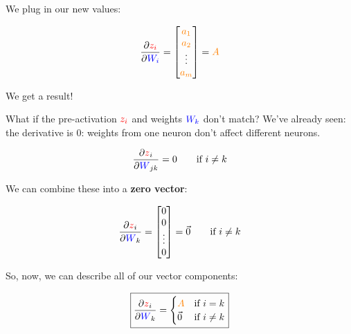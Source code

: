         We plug in our new values:
        
        \begin{equation}
            \frac{\partial  \textcolor{red}{z_i} }{\partial   \textcolor{blue}{W_{i}} } =
            \begin{bmatrix}
                \textcolor{orange}{a_1}
                \\
                \textcolor{orange}{a_2}
                \\
                \vdots
                \\
                \textcolor{orange}{a_m}
            \end{bmatrix}
            =
            \textcolor{orange}{A}
        \end{equation}
        
        We get a result!
        
        \subsecdiv
        
        What if the pre-activation $\textcolor{red}{z_i}$ and weights $\textcolor{blue}{W_{k}}$ don't match? We've already seen: the derivative is 0: weights from one neuron don't affect different neurons.
        
        \begin{equation}
            \frac{\partial  \textcolor{red}{z}_i }{\partial  \textcolor{blue}{W}_{jk} } = 0 
            \qquad
            \text{if } i \neq k
        \end{equation}
        
        We can combine these into a \textbf{zero vector}:
        
        \begin{equation}
            \frac{\partial  \textcolor{red}{z}_i }{\partial  \textcolor{blue}{W}_{k} } = 
            \begin{bmatrix}
                0\\0\\ \vdots \\ 0
            \end{bmatrix}
            =
            \vec{0}
            \qquad
            \text{if } i \neq k
        \end{equation}
        
        So, now, we can describe all of our vector components:
        
        \begin{equation}
            \boxed{
            \frac{\partial  \textcolor{red}{z}_i }{\partial  \textcolor{blue}{W}_{k} } = 
            \begin{cases}
              \textcolor{orange}{A} & \text{if } i = k\\
              \vec{0} & \text{if } i \neq k
            \end{cases}
            }
        \end{equation}

